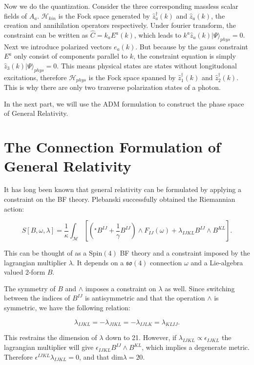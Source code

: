 \documentclass{article}
\begin{document}
Now we do the quantization. Consider the three corresponding massless scalar fields of $A_a$. $\mathcal{H}_{kin}$ is the Fock space generated by $\hat{z}^\dagger_a(k)$ and $\hat{z}_a(k)$, the creation and annihilation operators respectively. Under fourier transform, the constraint can be written as $\hat{C} = k_aE^a(k)$, which leads to $k^a\hat{z}_a(k)|\Psi\rangle_{phys} = 0$. Next we introduce polarized vectors $e_a(k)$. But because by the gauss constraint $E^a$ only consist of components parallel to $k$, the constraint equation is simply $\hat{z}_3(k)|\Psi\rangle_{phys} = 0$. This means physical states are states without longitudonal excitations, therefore $\mathcal{H}_{phys}$ is the Fock space spanned by $\hat{z}^\dagger_1(k)$ and $\hat{z}^\dagger_2(k)$. This is why there are only two tranverse polarization states of a photon.

\hrulefill

In the next part, we will use the ADM formulation to construct the phase space of General Relativity.


\section{The Connection Formulation of General Relativity}


It has long been known that general relativity can be formulated by applying a constraint on the BF theory. Plebanski successfully obtained the Riemannian action:

$$
S[B, \omega, \lambda] = \frac{1}{\kappa}\int_\mathcal{M}\left[\left(^\star\!B^{IJ} + \frac{1}{\gamma}B^{IJ}\right)\wedge F_{IJ}(\omega) + \lambda_{IJKL} B^{IJ}\wedge B^{KL}\right].
$$

This can be thought of as a $\mathrm{Spin}(4)$ BF theory and a constraint imposed by the lagrangian multiplier $\lambda$. It depends on a $\mathfrak{so}(4)$ connection $\omega$ and a Lie-algebra valued 2-form $B$.

The symmetry of $B$ and $\wedge$ imposes a constraint on $\lambda$ as well. Since switching between the indices of $B^{IJ}$ is antisymmetric and that the operation $\wedge$ is symmetric, we have the following relation:

$$
\lambda_{IJKL} = -\lambda_{JIKL} = -\lambda_{IJLK} = \lambda_{KLIJ}.
$$

This restrains the dimension of $\lambda$ down to 21. However, if $\lambda_{IJKL}\propto \epsilon_{IJKL}$ the lagrangian multiplier will give $\epsilon_{IJKL}B^{IJ}\wedge B^{KL}$, which implies a degenerate metric. Therefore $\epsilon^{IJKL}\lambda_{IJKL} = 0$, and that $\mathrm{dim}\lambda = 20$.
\end{document}
